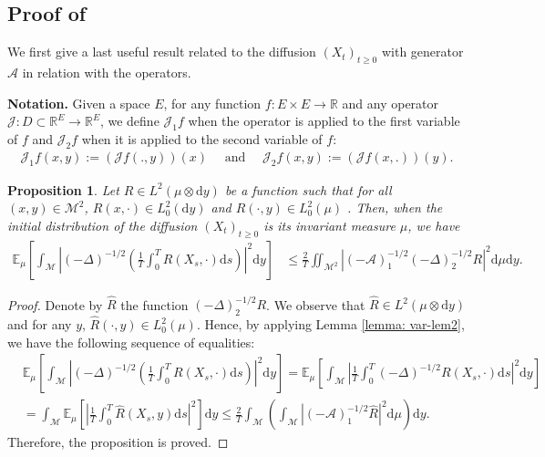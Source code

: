 \documentclass[10pt,a4paper]{article}
\newcommand{\E}{{\mathbb E}}
\newcommand{\R}{{\mathbb R}}
\newcommand\cA{\mathcal{A}}
\newcommand\cJ{\mathcal{J}}
\newcommand\cM{\mathcal{M}}
\newcommand\dd{\mathrm{d}}
\newcommand{\ABS}[1]{{{\left| #1 \right|}}} %
\newcommand{\PAR}[1]{{{\left(#1\right)}}} %
\newcommand{\SBRA}[1]{{{\left[#1\right]}}} %
\newtheorem{proposition}[theorem]{Proposition}
\begin{document}
\subsection{Proof  of  }\label{sec:conclusion-proof-mainA}

We first give a last useful result related to the diffusion $(X_t)_{t\ge 0}$ with generator $\cA$ in relation with the operators.
\medskip

\textbf{Notation.} Given a space $E$, for any function $f: E \times E \rightarrow \R$ and any operator $\cJ: D \subset \mathbb{R}^E \rightarrow   \mathbb{R}^E$, we define $\cJ_1f$ when the operator is applied to the first variable of $f$ and $\cJ_2f$ when it is applied to the second variable of $f$:
\begin{align*}\label{eq:notation-operator}
	\cJ_1f(x,y):=\PAR{\cJ f(.,y)}(x)\quad \text{ and }\quad \cJ_2f(x,y):=\PAR{\cJ f(x,.)}(y).
\end{align*}


\begin{proposition}\label{prop:1/2-op}
	Let $R \in L^2( \mu \otimes \dd y)$ be a function such that for all $(x,y) \in \cM^2$, $R(x,\cdot ) \in L^2_0(\dd y)$ and $R(\cdot, y) \in L^2_0(\mu)$ . Then, when the initial distribution of the diffusion $(X_t)_{t\ge 0}$ is its invariant measure $\mu$,  we have
	\begin{align*}
		\E_{\mu}\SBRA{\int_\cM\ABS{\PAR{-\Delta}^{-1/2}\PAR{\frac{1}{T}\int_0^T R(X_s, \cdot )\dd s}}^2\dd y}&\le \frac{2}{T}\iint_{\cM^2}\ABS{\PAR{-\cA}_1^{-1/2}\PAR{-\Delta}_2^{-1/2} R }^2\dd\mu\dd y.
	\end{align*}
\end{proposition}
\begin{proof}
	Denote by $\widehat{R}$ the function $(-\Delta)^{-1/2}_2R$. We observe that $\widehat{R} \in L^2( \mu \otimes \dd y)$ and for any $y$, $\widehat{R}(\cdot,y ) \in L^2_0(\mu )$. Hence, by applying  Lemma \ref{lemma: var-lem2}, we have the following sequence of equalities:
	\begin{align*}
		& \E_{\mu}\SBRA{\int_\cM\ABS{\PAR{-\Delta}^{-1/2}\PAR{\frac{1}{T}\int_0^T R(X_s, \cdot )\dd s}}^2\dd y} =\E_{\mu}\SBRA{\int_\cM\ABS{\frac{1}{T}\int_0^T \PAR{-\Delta}^{-1/2} R(X_s, \cdot )\dd s}^2\dd y}\\
		&= \int_\cM \E_{\mu}\SBRA{\ABS{\frac{1}{T}\int_0^T \widehat{R}(X_s, y )\dd s}^2}\dd y \le \frac{2}{T}\int_{\cM} \PAR{\int_{\cM}\ABS{\PAR{-\cA}_1^{-1/2}\widehat{R} }^2\dd\mu}\dd y.
	\end{align*}
	Therefore, the proposition is proved.
\end{proof}
\end{document}
